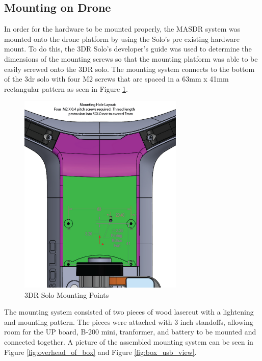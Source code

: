 \subsection{Mounting on Drone} \label{Mounting}
In order for the hardware to be mounted properly, the MASDR system was mounted onto the drone platform by using the Solo’s pre existing hardware mount. To do this, the 3DR Solo’s developer's guide was used to determine the dimensions of the mounting screws so that the mounting platform was able to be easily screwed onto the 3DR solo. The mounting system connects to the bottom of the 3dr solo with four M2 screws that are spaced in a 63mm x 41mm rectangular pattern as seen in Figure \ref{fig:solo_mount}.
\begin{figure}[ht]
\centering
\includegraphics[width=0.70\textwidth]{img/solo_mount_points.png}
\caption{3DR Solo Mounting Points}
\label{fig:solo_mount}
\end{figure} \par
The mounting system consisted of two pieces of wood lasercut with a lightening and mounting pattern. The pieces were attached with 3 inch standoffs, allowing room for the UP board, B-200 mini, tranformer, and battery to be mounted and connected together. A picture of the assembled mounting system can be seen in Figure \ref{fig:overhead_of_box} and Figure \ref{fig:box_usb_view}.

